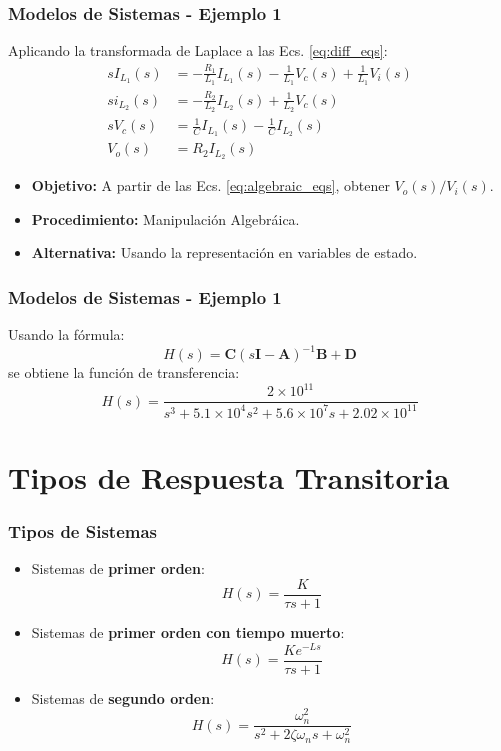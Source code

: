 \documentclass[aspectratio=169,handout]{beamer}
\theoremstyle{definition}
\theoremstyle{plain}
\theoremstyle{remark}
\begin{document}
\begin{frame}[<+->]\frametitle{Modelos de Sistemas - Ejemplo 1}
Aplicando la transformada de Laplace a las Ecs. \eqref{eq:diff_eqs}:
\begin{subequations}\label{eq:algebraic_eqs}
\begin{align}
  s I_{L_1}(s) &= -\frac{R_1}{L_1}I_{L_1}(s) - \frac{1}{L_1} V_c(s) + \frac{1}{L_1} V_i(s) \\
  s i_{L_2}(s) &= -\frac{R_2}{L_2}I_{L_2}(s) + \frac{1}{L_2} V_c(s) \\
  s V_c(s) &= \frac{1}{C}I_{L_1}(s) - \frac{1}{C}I_{L_2}(s)\\
  V_o(s) &= R_2 I_{L_2}(s)
\end{align}
\end{subequations}
\vspace*{-5mm}
\begin{itemize}
  \item \textbf{Objetivo:} A partir de las Ecs. \eqref{eq:algebraic_eqs}, obtener $V_o(s)/V_i(s)$.
  \item \textbf{Procedimiento:} Manipulación Algebráica.
  \item \textbf{Alternativa:} Usando la representación en variables de estado.
\end{itemize}
\end{frame}

\begin{frame}[<-+>]\frametitle{Modelos de Sistemas - Ejemplo 1}
  Usando la fórmula:
  \begin{equation}
    H(s) = \mathbf{C}(s\mathbf{I}-\mathbf{A})^{-1}\mathbf{B} + \mathbf{D}
  \end{equation}
  se obtiene la función de transferencia:
  \begin{equation}
    H(s) = \frac{2\times10^{11}}{s^3 + 5.1\times10^4 s^2 + 5.6\times10^7 s + 2.02\times10^{11}}
  \end{equation}
\end{frame}

\section{Tipos de Respuesta Transitoria}
\begin{frame}[<-+>]\frametitle{Tipos de Sistemas}
\begin{itemize}
  \item Sistemas de \textbf{primer orden}:
  \begin{equation*}
    H(s) = \frac{K}{\tau s + 1}
  \end{equation*}
  \item Sistemas de \textbf{primer orden con tiempo muerto}:
  \begin{equation*}
    H(s) = \frac{K e^{-Ls}}{\tau s + 1}
  \end{equation*}
  \item Sistemas de \textbf{segundo orden}:
  \begin{equation*}
    H(s) = \frac{\omega_n^2}{s^2 + 2 \zeta \omega_n s + \omega_n^2}
  \end{equation*}
\end{itemize}
\end{frame}
\end{document}
